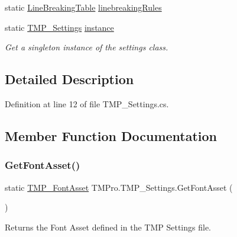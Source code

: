 \begin{DoxyCompactItemize}
static \mbox{\hyperlink{class_t_m_pro_1_1_t_m_p___settings_1_1_line_breaking_table}{Line\+Breaking\+Table}} \mbox{\hyperlink{class_t_m_pro_1_1_t_m_p___settings_a5db629ee06cfa2c662645f18325b7db5}{linebreaking\+Rules}}
\item 
static \mbox{\hyperlink{class_t_m_pro_1_1_t_m_p___settings}{T\+M\+P\+\_\+\+Settings}} \mbox{\hyperlink{class_t_m_pro_1_1_t_m_p___settings_a27bd5ea027ced6add42d15cc09d2925b}{instance}}
\begin{DoxyCompactList}\small\item\em Get a singleton instance of the settings class. \end{DoxyCompactList}\end{DoxyCompactItemize}


\subsection{Detailed Description}


Definition at line 12 of file T\+M\+P\+\_\+\+Settings.\+cs.



\subsection{Member Function Documentation}
\mbox{\label{class_t_m_pro_1_1_t_m_p___settings_a2075e0ea181b5570c581f648d2deea6c}} 
\subsubsection{\texorpdfstring{GetFontAsset()}{GetFontAsset()}}
{\footnotesize\ttfamily static \mbox{\hyperlink{class_t_m_pro_1_1_t_m_p___font_asset}{T\+M\+P\+\_\+\+Font\+Asset}} T\+M\+Pro.\+T\+M\+P\+\_\+\+Settings.\+Get\+Font\+Asset (\begin{DoxyParamCaption}{ }\end{DoxyParamCaption})\hspace{0.3cm}{\ttfamily [static]}}



Returns the Font Asset defined in the T\+MP Settings file. 

